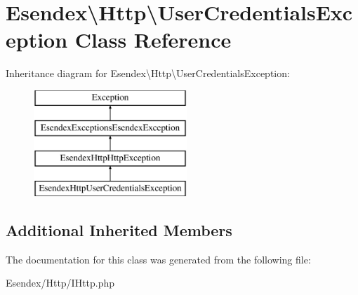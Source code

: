 \section{Esendex\textbackslash{}Http\textbackslash{}User\-Credentials\-Exception Class Reference}
\label{class_esendex_1_1_http_1_1_user_credentials_exception}
Inheritance diagram for Esendex\textbackslash{}Http\textbackslash{}User\-Credentials\-Exception\-:\begin{figure}[H]
\begin{center}
\leavevmode
\includegraphics[height=4.000000cm]{class_esendex_1_1_http_1_1_user_credentials_exception}
\end{center}
\end{figure}
\subsection*{Additional Inherited Members}


The documentation for this class was generated from the following file\-:\begin{DoxyCompactItemize}
\item 
Esendex/\-Http/I\-Http.\-php\end{DoxyCompactItemize}
